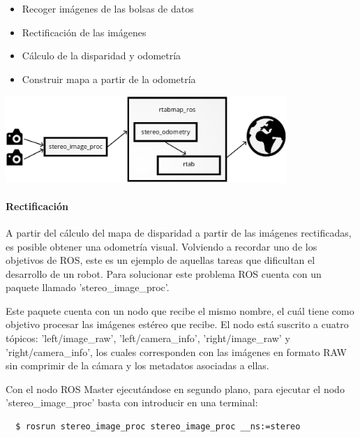 \begin{itemize}
  \item Recoger imágenes de las bolsas de datos
  \item Rectificación de las imágenes
  \item Cálculo de la disparidad y odometría
  \item Construir mapa a partir de la odometría
\end{itemize}

\begin{minipage}{\linewidth}
    \centering
    \includegraphics[width=0.8\textwidth]{images/cap4/Carro-esquema.eps}
    \label{fig:Carro-esquema}
\end{minipage}

\paragraph{Rectificación} \hspace{0pt}

A partir del cálculo del mapa de disparidad a partir de las imágenes
rectificadas, es posible obtener una odometría visual. Volviendo a recordar uno
de los objetivos de ROS, este es un ejemplo de aquellas tareas que dificultan el
desarrollo de un robot. Para solucionar este problema ROS cuenta con un paquete
llamado 'stereo\_image\_proc'.

Este paquete cuenta con un nodo que recibe el mismo nombre, el cuál tiene como
objetivo procesar las imágenes estéreo que recibe. El nodo está suscrito a
cuatro tópicos: 'left/image\_raw', 'left/camera\_info', 'right/image\_raw' y
'right/camera\_info', los cuales corresponden con las imágenes en formato RAW
sin comprimir de la cámara y los metadatos asociadas a ellas.

Con el nodo ROS Master ejecutándose en segundo plano, para ejecutar el nodo
'stereo\_image\_proc' basta con introducir en una terminal:
\\
\begin{lstlisting}
  $ rosrun stereo_image_proc stereo_image_proc __ns:=stereo
\end{lstlisting}

